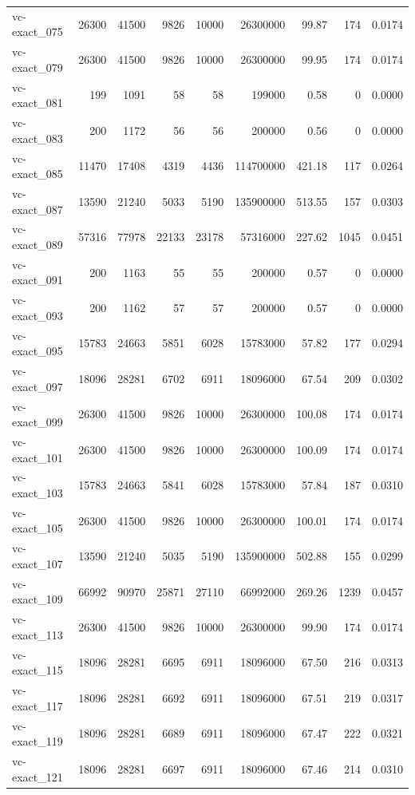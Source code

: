 {\begin{longtable}{lrrrrrrrr}
vc-exact\_075 & 26300 & 41500 & 9826 & 10000 & 26300000 & 99.87 & 174 & 0.0174 \\
vc-exact\_079 & 26300 & 41500 & 9826 & 10000 & 26300000 & 99.95 & 174 & 0.0174 \\
vc-exact\_081 & 199 & 1091 & 58 & 58 & 199000 & 0.58 & 0 & 0.0000 \\
vc-exact\_083 & 200 & 1172 & 56 & 56 & 200000 & 0.56 & 0 & 0.0000 \\
vc-exact\_085 & 11470 & 17408 & 4319 & 4436 & 114700000 & 421.18 & 117 & 0.0264 \\
vc-exact\_087 & 13590 & 21240 & 5033 & 5190 & 135900000 & 513.55 & 157 & 0.0303 \\
vc-exact\_089 & 57316 & 77978 & 22133 & 23178 & 57316000 & 227.62 & 1045 & 0.0451 \\
vc-exact\_091 & 200 & 1163 & 55 & 55 & 200000 & 0.57 & 0 & 0.0000 \\
vc-exact\_093 & 200 & 1162 & 57 & 57 & 200000 & 0.57 & 0 & 0.0000 \\
vc-exact\_095 & 15783 & 24663 & 5851 & 6028 & 15783000 & 57.82 & 177 & 0.0294 \\
vc-exact\_097 & 18096 & 28281 & 6702 & 6911 & 18096000 & 67.54 & 209 & 0.0302 \\
vc-exact\_099 & 26300 & 41500 & 9826 & 10000 & 26300000 & 100.08 & 174 & 0.0174 \\
vc-exact\_101 & 26300 & 41500 & 9826 & 10000 & 26300000 & 100.09 & 174 & 0.0174 \\
vc-exact\_103 & 15783 & 24663 & 5841 & 6028 & 15783000 & 57.84 & 187 & 0.0310 \\
vc-exact\_105 & 26300 & 41500 & 9826 & 10000 & 26300000 & 100.01 & 174 & 0.0174 \\
vc-exact\_107 & 13590 & 21240 & 5035 & 5190 & 135900000 & 502.88 & 155 & 0.0299 \\
vc-exact\_109 & 66992 & 90970 & 25871 & 27110 & 66992000 & 269.26 & 1239 & 0.0457 \\
vc-exact\_113 & 26300 & 41500 & 9826 & 10000 & 26300000 & 99.90 & 174 & 0.0174 \\
vc-exact\_115 & 18096 & 28281 & 6695 & 6911 & 18096000 & 67.50 & 216 & 0.0313 \\
vc-exact\_117 & 18096 & 28281 & 6692 & 6911 & 18096000 & 67.51 & 219 & 0.0317 \\
vc-exact\_119 & 18096 & 28281 & 6689 & 6911 & 18096000 & 67.47 & 222 & 0.0321 \\
vc-exact\_121 & 18096 & 28281 & 6697 & 6911 & 18096000 & 67.46 & 214 & 0.0310 \\

\end{longtable}}
